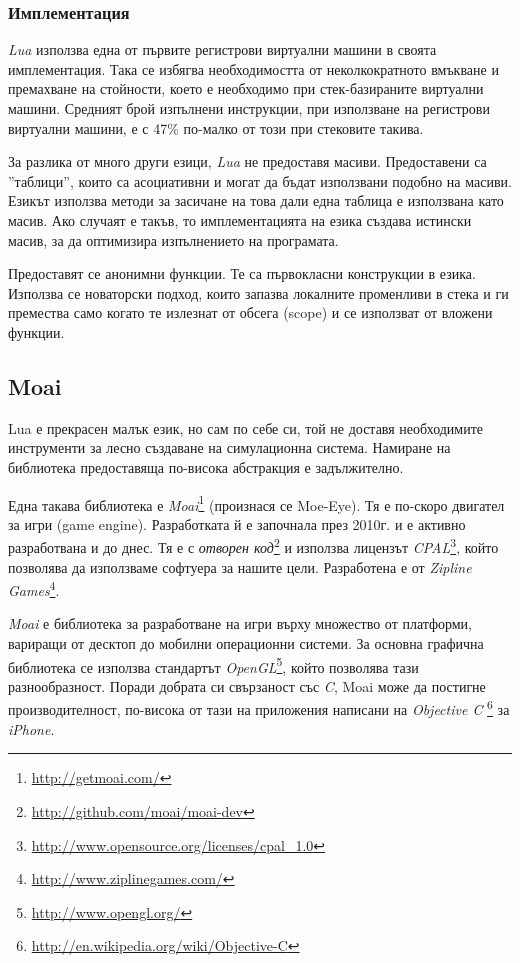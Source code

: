 		\subsubsection{Имплементация}
		
			\emph{Lua} използва една от първите регистрови виртуални машини в своята имплементация. Така се избягва
			необходимостта от неколкократното вмъкване и премахване на стойности, 
			което е необходимо при стек-базираните виртуални машини. Средният брой изпълнени инструкции, при използване
			на регистрови виртуални машини, е с 47\% по-малко от този при стековите такива. \cite{Khan}
			
			За разлика от много други езици, \emph{Lua} не предоставя масиви. Предоставени са ''таблици'', които
			са асоциативни и могат да бъдат използвани подобно на масиви. Езикът използва методи за
			засичане на това дали една таблица е използвана като масив. Ако случаят е такъв, то имплементацията
			на езика създава истински масив, за да оптимизира изпълнението на програмата.
			
			Предоставят се анонимни функции. Те са първокласни конструкции в езика. Използва се новаторски подход,
			които запазва локалните променливи в стека и ги премества само когато те излезнат от обсега (scope) и
			се използват от вложени функции.
	
	\subsection{Moai}
	
		Lua е прекрасен малък език, но сам по себе си, той не доставя необходимите инструменти
		за лесно създаване на симулационна система. Намиране на библиотека предоставяща по-висока
		абстракция е задължително.
		
		Една такава библиотека е \emph{Moai}\footnote{\url{http://getmoai.com/}} (произнася се Moe-Eye).
		Тя е по-скоро двигател за игри (game engine).
		Разработката й е започнала през 2010г. и е активно разработвана и до днес. 
		Тя е с \emph{отворен код}\footnote{\url{http://github.com/moai/moai-dev}}
		и използва лицензът \emph{CPAL}\footnote{\url{http://www.opensource.org/licenses/cpal_1.0}}, който
		позволява да използваме софтуера за нашите цели. 
		Разработена е от \emph{Zipline Games}\footnote{\url{http://www.ziplinegames.com/}}.						
		
		\emph{Moai} е библиотека за разработване на игри върху множество от платформи, вариращи от десктоп до
		мобилни операционни системи. За основна графична библиотека се използва стандартът 
		\emph{OpenGL}\footnote{\url{http://www.opengl.org/}}, който позволява тази разнообразност.
		Поради добрата си свързаност със \emph{C}, Moai може да постигне производителност, по-висока
		от тази на приложения написани на  \emph{Objective C}
		\footnote{\url{http://en.wikipedia.org/wiki/Objective-C}} за \emph{iPhone}.
		
